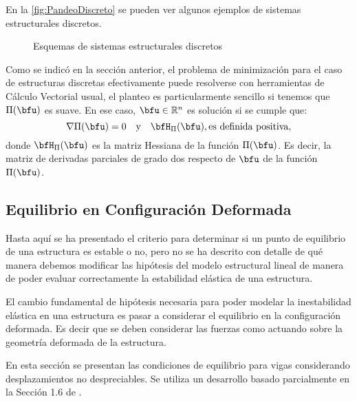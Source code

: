 En la \autoref{fig:PandeoDiscreto} se pueden ver algunos ejemplos de sistemas estructurales discretos.

\begin{figure}[htb]
	\centering
{}
\hspace{6em}
\caption{Esquemas de sistemas estructurales discretos}
	\label{fig:PandeoDiscreto}
\end{figure}

Como se indicó en la sección anterior, el problema de minimización para el caso de estructuras discretas efectivamente puede resolverse con herramientas de Cálculo Vectorial usual, el planteo es particularmente sencillo si tenemos que $\Pi(\bfu)$ es suave. En ese caso, $\bfu \in \mathbb{R}^n$ es solución si se cumple que:
%
$$\nabla \Pi(\bfu)=0 \quad \text{y} \quad  \bfH_\Pi (\bfu), \text{es definida positiva},$$
%
donde $\bfH_\Pi(\bfu)$ es la matriz Hessiana de la función $\Pi(\bfu)$. Es decir, la matriz de derivadas parciales de grado dos respecto de $\bfu$ de la función $\Pi(\bfu)$.


\subsection{Equilibrio en Configuración Deformada}

Hasta aquí se ha presentado el criterio para determinar si un punto de equilibrio de una estructura es estable o no, pero no se ha descrito con detalle de qué manera debemos modificar las hipótesis del modelo estructural lineal de manera de poder evaluar correctamente la estabilidad elástica de una estructura.

El cambio fundamental de hipótesis necesaria para poder modelar la inestabilidad elástica en una estructura es pasar a considerar el equilibrio en la configuración deformada. Es decir que se deben considerar las fuerzas como actuando sobre la geometría deformada de la estructura.

En esta sección se presentan las condiciones de equilibrio para vigas considerando desplazamientos no despreciables. Se utiliza un desarrollo basado parcialmente en la Sección 1.6 de \citep{yoo2011}.

